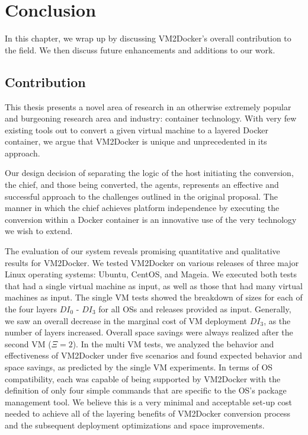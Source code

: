 \chapter{Conclusion}
\label{chap:conclusion}
In this chapter, we wrap up by discussing VM2Docker's overall contribution to the field. We then discuss future enhancements and additions to our work.

\section{Contribution}
This thesis presents a novel area of research in an otherwise extremely popular and burgeoning research area and industry: container technology. With very few existing tools out to convert a given virtual machine to a layered Docker container, we argue that VM2Docker is unique and unprecedented in its approach. 

Our design decision of separating the logic of the host initiating the conversion, the chief, and those being converted, the agents, represents an effective and successful approach to the challenges outlined in the original proposal. The manner in which the chief achieves platform independence by executing the conversion within a Docker container is an innovative use of the very technology we wish to extend.

The evaluation of our system reveals promising quantitative and qualitative results for VM2Docker. We tested VM2Docker on various releases of three major Linux operating systems: Ubuntu, CentOS, and Mageia. We executed both tests that had a single virtual machine as input, as well as those that had many virtual machines as input. The single VM tests showed the breakdown of sizes for each of the four layers $DI_0$ - $DI_3$ for all OSs and releases provided as input. Generally, we saw an overall decrease in the marginal cost of VM deployment $DI_3$, as the number of layers increased. Overall space savings were always realized after the second VM ($\Xi = 2$). In the multi VM tests, we analyzed the behavior and effectiveness of VM2Docker under five scenarios and found expected behavior and space savings, as predicted by the single VM experiments. In terms of OS compatibility, each was capable of being supported by VM2Docker with the definition of only four simple commands that are specific to the OS's package management tool. We believe this is a very minimal and acceptable set-up cost needed to achieve all of the layering benefits of VM2Docker conversion process and the subsequent deployment optimizations and space improvements.

